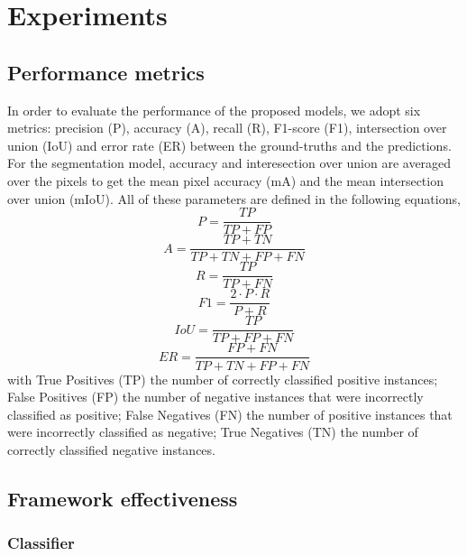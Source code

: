 \documentclass[amt, article]{copernicus}
\begin{document}
\section{Experiments}
\label{sec:experiments}

\subsection{Performance metrics}

In order to evaluate the performance of the proposed models, we adopt six metrics: precision (P), accuracy (A), recall (R), F1-score (F1), intersection over union (IoU) and error rate (ER) between the ground-truths and the predictions. For the segmentation model, accuracy and interesection over union are averaged over the pixels to get the mean pixel accuracy (mA) and the mean intersection over union (mIoU). All of these parameters are defined in the following equations,
\begin{equation}
    P = \frac{TP}{TP + FP}
\end{equation}
\begin{equation}
    A = \frac{TP + TN}{TP + TN + FP + FN}
\end{equation}
\begin{equation}
    R = \frac{TP}{TP + FN}
\end{equation}
\begin{equation}
    F1 = \frac{2 \cdot P \cdot R}{P + R}
\end{equation}
\begin{equation}
    IoU = \frac{TP}{TP + FP + FN}
\end{equation}
\begin{equation}
    ER = \frac{FP + FN}{TP + TN + FP + FN}
\end{equation}
with True Positives (TP) the number of correctly classified positive instances; False Positives (FP) the number of negative instances that were incorrectly classified as positive; False Negatives (FN) the number of positive instances that were incorrectly classified as negative; True Negatives (TN) the number of correctly classified negative instances.

\subsection{Framework effectiveness}

\subsubsection{Classifier}
\end{document}
